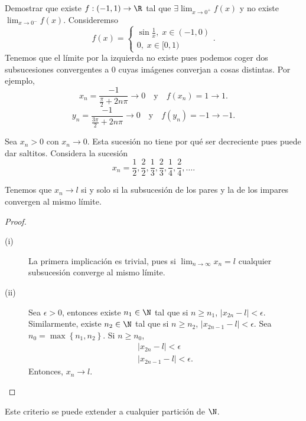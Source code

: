 \begin{eg}
\normalfont Demostrar que existe $\displaystyle f : \left(-1,1\right) \to \R $ tal que $\displaystyle \exists \lim_{x \to 0^{+}}f\left(x\right) $ y no existe $\displaystyle \lim_{x \to 0^{-}}f\left(x\right) $. Consideremso 
\[f\left(x\right) = 
\begin{cases}
\sin\frac{1}{x}, \; x \in \left(-1,0\right) \\
0, \; x \in [0,1)
\end{cases}
.\]
Tenemos que el límite por la izquierda no existe pues podemos coger dos subsucesiones convergentes a 0 cuyas imágenes converjan a cosas distintas. Por ejemplo, 
\[x_{n} = \frac{-1}{\frac{\pi }{2}+2n\pi } \to 0 \quad \text{y} \quad f\left(x_{n}\right) = 1 \to 1 .\]
\[y_{n} = \frac{-1}{\frac{3\pi }{2} + 2n\pi } \to 0 \quad \text{y} \quad f\left(y_{n}\right) = - 1 \to - 1.\]
\end{eg}

\begin{eg}
\normalfont Sea $\displaystyle x_{n} > 0 $ con $\displaystyle x_{n} \to 0 $. Esta sucesión no tiene por qué ser decreciente pues puede dar saltitos. Considera la sucesión
\[x_{n} = \frac{1}{2}, \frac{2}{2}, \frac{1}{3}, \frac{2}{3}, \frac{1}{4}, \frac{2}{4}, \ldots.\]
\end{eg}

\begin{fprop}[]
\normalfont Tenemos que $\displaystyle x_{n} \to l  $ si y solo si la subsucesión de los pares y la de los impares convergen al mismo límite.
\end{fprop}

\begin{proof}
\begin{description}
\item[(i)] La primera implicación es trivial, pues si $\displaystyle \lim_{n \to \infty}x_{n} = l $ cualquier subsucesión converge al mismo límite.
\item[(ii)] Sea $\displaystyle \epsilon > 0 $, entonces existe $\displaystyle n_{1} \in \N $ tal que si $\displaystyle n \geq n_{1} $, $\displaystyle \left|x_{2n}-l\right|<\epsilon  $. Similarmente, existe $\displaystyle n_{2} \in \N $ tal que si $\displaystyle n \geq n_{2} $, $\displaystyle \left|x_{2n-1}-l\right|<\epsilon  $. Sea $\displaystyle n_{0} = \max \left\{ n_{1}, n_{2}\right\}  $. Si $\displaystyle  n\geq n_{0} $, 
	\[
	\begin{split}
	\left|x_{2n}-l\right|<\epsilon \\
	\left|x_{2n-1}-l\right|<\epsilon.
	\end{split}
	\]
	Entonces, $\displaystyle x_{n}\to l $.
\end{description}
\end{proof}
\begin{observation}
\normalfont Este criterio se puede extender a cualquier partición de $\displaystyle \N $.
\end{observation}

